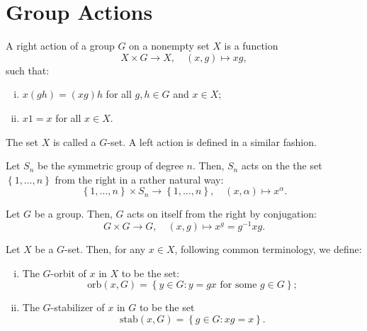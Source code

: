 \section{Group Actions}\label{sec:group-actions}

\begin{definition}\label{def:group-action}
  A right action of a group \(G\) on a nonempty set \(X\) is a function
  \[
    X\times{G}\to{X},\quad(x,g)\mapsto{xg},
  \]
  such that:
  \begin{enumerate}[i.]
    \item
      \(x(gh)=(xg)h\) for all \(g,h\in{G}\) and \(x\in{X}\);
    \item
      \(x1=x\) for all \(x\in{X}\).
  \end{enumerate}
  The set \(X\) is called a \(G\)-set. A left action is defined in a similar
  fashion.
\end{definition}

\begin{example}\label{ex:action-of-symmetric-groups}
  Let \(S_{n}\) be the symmetric group of degree \(n\). Then, \(S_{n}\) acts on
  the the set \(\left\{1,\ldots,n\right\}\) from the right in a rather natural
  way:
  \[
    \left\{1,\ldots,n\right\}\times{S_{n}}\to\left\{1,\ldots,n\right\},
    \quad
    (x,\alpha)\mapsto{x^{\alpha}}.
  \]
\end{example}

\begin{example}\label{ex:conjugation}
  Let \(G\) be a group. Then, \(G\) acts on itself from the right by conjugation:
  \[
    G\times{G}\to{G},\quad(x,g)\mapsto{x^{g}=g^{-1}xg}.
  \]
\end{example}

\begin{definition}\label{def:orbits-and-stabilizers}
  Let \(X\) be a \(G\)-set. Then, for any \({x}\in{X}\), following common
  terminology, we define:
  \begin{enumerate}[i.]
    \item
      The \(G\)-orbit of \(x\) in \(X\) to be the set:
      \[
        \text{orb}(x,G)
        =
        \left\{y\in{G}:y=gx\text{ for some }g\in{G}\right\};
      \]
    \item
      The \(G\)-stabilizer of \(x\) in \(G\) to be the set
      \[
        \text{stab}(x,G)
        =
        \left\{g\in{G}:xg=x\right\}.
      \]
  \end{enumerate}
\end{definition}

